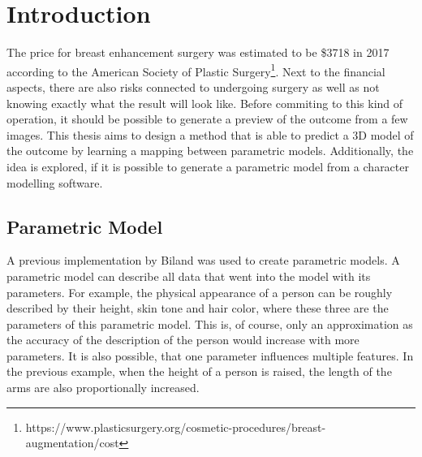 \setcounter{chapter}{0}

\chapter{Introduction}

The price for breast enhancement surgery was estimated to be \$3718 in 2017 according to the American Society of Plastic Surgery\footnote{https://www.plasticsurgery.org/cosmetic-procedures/breast-augmentation/cost}. Next to the financial aspects, there are also risks connected to undergoing surgery as well as not knowing exactly what the result will look like. Before commiting to this kind of operation, it should be possible to generate a preview of the outcome from a few images. This thesis aims to design a method that is able to predict a 3D model of the outcome by learning a mapping between parametric models. Additionally, the idea is explored, if it is possible to generate a parametric model from a character modelling software.




\section{Parametric Model}
A previous implementation by Biland \cite{Biland17} was used to create parametric models. A parametric model can describe all data that went into the model with its parameters. For example, the physical appearance of a person can be roughly described by their height, skin tone and hair color, where these three are the parameters of this parametric model. This is, of course, only an approximation as the accuracy of the description of the person would increase with more parameters. It is also possible, that one parameter influences multiple features. In the previous example, when the height of a person is raised, the length of the arms are also proportionally increased.


